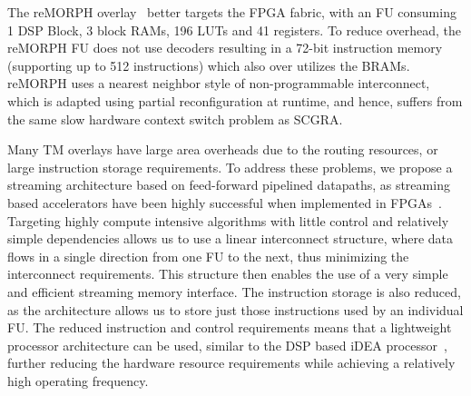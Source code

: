 The reMORPH overlay~\cite{paul2012remorph} better targets the FPGA fabric, with an FU consuming 1 DSP Block, 3 block RAMs, 196 LUTs and 41 registers.
To reduce overhead, the reMORPH FU does not use decoders resulting in a 72-bit instruction memory (supporting up to 512 instructions) which also over utilizes the BRAMs.
reMORPH uses a nearest neighbor style of non-programmable interconnect, which is adapted using partial reconfiguration at runtime, and hence, suffers from the same slow hardware context switch problem as SCGRA.


Many TM overlays have large area overheads due to the routing resources, or large instruction storage requirements.
To address these problems, we propose a streaming architecture based on feed-forward pipelined datapaths, as streaming based accelerators have been highly successful when implemented in FPGAs~\cite{oliver2005reconfigurable, saqib2015pipelined}. Targeting highly compute intensive algorithms with little control and relatively simple dependencies allows us to use a linear interconnect structure, where data flows in a single direction from one FU to the next, thus minimizing the interconnect requirements. This structure then enables the use of a very simple and efficient streaming memory interface. The instruction storage is also reduced, as the architecture allows us to store just those instructions used by an individual FU. The reduced instruction and control requirements means that a lightweight processor architecture can be used, similar to the DSP based iDEA processor~\cite{cheah2012idea}, further reducing the hardware resource requirements while achieving a relatively high operating frequency.

\begin{comment}
Most of the time multiplexed overlays described above suffer from large area overheads due to the routing resources, or the large instruction storage requirements.
To address these issues, we propose a streaming architecture based on feed-forward pipelined datapaths, as accelerators based on the streaming model have been highly successful when implemented in FPGAs~\cite{oliver2005reconfigurable, saqib2015pipelined}. Targeting highly compute intensive algorithms with little control and relatively simple dependencies allows us to use a simple linear interconnect structure, where data flows in a single direction from one FU to the next, thus minimizing the interconnect requirements. This structure then enables the use of a very simple and efficient streaming memory interface. The instruction storage is also reduced, as the architecture allows us to store just those instructions used by an individual FU. The reduced instruction and control requirements means that a lightweight processor architecture can be used, similar to the DSP based iDEA processor~\cite{cheah2012idea}, further reducing the hardware resource requirements while achieving a relatively high operating frequency.
\end{comment}

